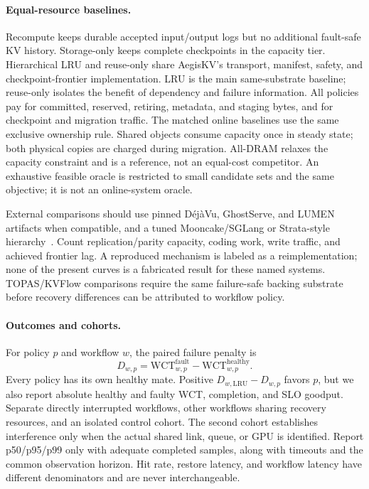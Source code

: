 \documentclass[sigplan,10pt,anonymous,nonacm]{acmart}
\begin{document}
\paragraph{Equal-resource baselines.}
Recompute keeps durable accepted input/output logs but no additional
fault-safe KV history. Storage-only keeps complete checkpoints in the
capacity tier. Hierarchical LRU and reuse-only share AegisKV's transport,
manifest, safety, and checkpoint-frontier implementation. LRU is the main
same-substrate baseline; reuse-only isolates the benefit of dependency and
failure information. All policies pay for committed, reserved, retiring,
metadata, and staging bytes, and for checkpoint and migration traffic.
The matched online baselines use the same exclusive ownership rule.
Shared objects consume capacity once in steady state; both physical
copies are charged during migration. All-DRAM relaxes
the capacity constraint and is a reference, not an equal-cost competitor.
An exhaustive feasible oracle is restricted to small candidate sets and
the same objective; it is not an online-system oracle.

External comparisons should use pinned D\'ej\`aVu, GhostServe, and LUMEN
artifacts when compatible, and a tuned Mooncake/SGLang or Strata-style
hierarchy~\cite{strati2024dejavu,jayakody2026ghostserve,cao2026lumen,qin2025mooncake,xie2026strata}.
Count replication/parity capacity, coding work, write traffic, and achieved
frontier lag. A reproduced mechanism is labeled as a reimplementation;
none of the present curves is a fabricated result for these named systems.
TOPAS/KVFlow comparisons require the same failure-safe backing substrate
before recovery differences can be attributed to workflow policy.

\paragraph{Outcomes and cohorts.}
For policy $p$ and workflow $w$, the paired failure penalty is
\begin{equation}
 D_{w,p}=\mathrm{WCT}^{\mathrm{fault}}_{w,p}
          -\mathrm{WCT}^{\mathrm{healthy}}_{w,p}.
 \label{eq:eval-penalty}
\end{equation}
Every policy has its own healthy mate. Positive
$D_{w,\mathrm{LRU}}-D_{w,p}$ favors $p$, but we also report absolute healthy
and faulty WCT, completion, and SLO goodput. Separate directly interrupted
workflows, other workflows sharing recovery resources, and an isolated
control cohort. The second cohort establishes interference only when
the actual shared link, queue, or GPU is identified. Report p50/p95/p99
only with adequate completed samples, along with timeouts and the common
observation horizon. Hit rate, restore latency, and workflow latency have
different denominators and are never interchangeable.
\end{document}
